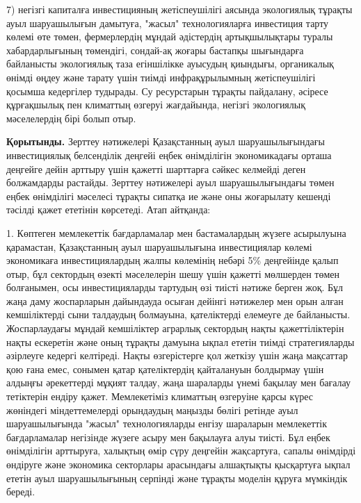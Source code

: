 \begin{multicols}{2}
7) негізгі капиталға инвестицияның жетіспеушілігі аясында экологиялық
тұрақты ауыл шаруашылығын дамытуға, "жасыл" технологияларға инвестиция
тарту көлемі өте төмен, фермерлердің мұндай әдістердің артықшылықтары
туралы хабардарлығының төмендігі, сондай-ақ жоғары бастапқы шығындарға
байланысты экологиялық таза егіншілікке ауысудың қиындығы, органикалық
өнімді өңдеу және тарату үшін тиімді инфрақұрылымның жетіспеушілігі
қосымша кедергілер тудырады. Су ресурстарын тұрақты пайдалану, әсіресе
құрғақшылық пен климаттың өзгеруі жағдайында, негізгі экологиялық
мәселелердің бірі болып отыр.

{\bfseries Қорытынды.} Зерттеу нәтижелері Қазақстанның ауыл
шаруашылығындағы инвестициялық белсенділік деңгейі еңбек өнімділігін
экономикадағы орташа деңгейге дейін арттыру үшін қажетті шарттарға
сәйкес келмейді деген болжамдарды растайды. Зерттеу нәтижелері ауыл
шаруашылығындағы төмен еңбек өнімділігі мәселесі тұрақты сипатқа ие және
оны жоғарылату кешенді тәсілді қажет ететінін көрсетеді. Атап айтқанда:

1. Көптеген мемлекеттік бағдарламалар мен бастамалардың жүзеге
асырылуына қарамастан, Қазақстанның ауыл шаруашылығына инвестициялар
көлемі экономикаға инвестициялардың жалпы көлемінің небәрі 5\%
деңгейінде қалып отыр, бұл сектордың өзекті мәселелерін шешу үшін
қажетті мөлшерден төмен болғанымен, осы инвестицияларды тартудың өзі
тиісті нәтиже берген жоқ. Бұл жаңа даму жоспарларын дайындауда осыған
дейінгі нәтижелер мен орын алған кемшіліктерді сыни талдаудың болмауына,
қателіктерді елемеуге де байланысты. Жоспарлаудағы мұндай кемшіліктер
аграрлық сектордың нақты қажеттіліктерін нақты ескеретін және оның
тұрақты дамуына ықпал ететін тиімді стратегияларды әзірлеуге кедергі
келтіреді. Нақты өзгерістерге қол жеткізу үшін жаңа мақсаттар қою ғана
емес, сонымен қатар қателіктердің қайталануын болдырмау үшін алдыңғы
әрекеттерді мұқият талдау, жаңа шараларды үнемі бақылау мен бағалау
тетіктерін ендіру қажет. Мемлекетіміз климаттың өзгеруіне қарсы күрес
жөніндегі міндеттемелерді орындаудың маңызды бөлігі ретінде ауыл
шаруашылығында "жасыл" технологияларды енгізу шараларын мемлекеттік
бағдарламалар негізінде жүзеге асыру мен бақылауға алуы тиісті. Бұл
еңбек өнімділігін арттыруға, халықтың өмір сүру деңгейін жақсартуға,
сапалы өнімдірді өндіруге және экономика секторлары арасындағы
алшақтықты қысқартуға ықпал ететін ауыл шаруашылығының серпінді және
тұрақты моделін құруға мүмкіндік береді.


\end{multicols}
